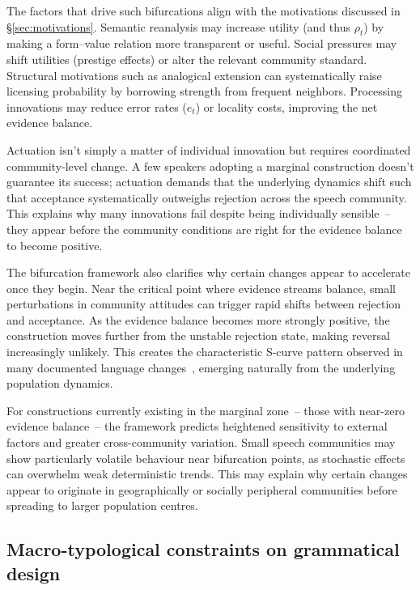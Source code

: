 \documentclass[12pt,letterpaper]{article}
\begin{document}
The factors that drive such bifurcations align with the motivations discussed in \S\ref{sec:motivations}. Semantic reanalysis may increase utility (and thus $\rho_t$) by making a form--value relation more transparent or useful. Social pressures may shift utilities (prestige effects) or alter the relevant community standard. Structural motivations such as analogical extension can systematically raise licensing probability by borrowing strength from frequent neighbors. Processing innovations may reduce error rates ($e_t$) or locality costs, improving the net evidence balance.

Actuation isn't simply a matter of individual innovation but requires coordinated community-level change. A few speakers adopting a marginal construction doesn't guarantee its success; actuation demands that the underlying dynamics shift such that acceptance systematically outweighs rejection across the speech community. This explains why many innovations fail despite being individually sensible~--  they appear before the community conditions are right for the evidence balance to become positive.

The bifurcation framework also clarifies why certain changes appear to accelerate once they begin. Near the critical point where evidence streams balance, small perturbations in community attitudes can trigger rapid shifts between rejection and acceptance. As the evidence balance becomes more strongly positive, the construction moves further from the unstable rejection state, making reversal increasingly unlikely. This creates the characteristic S-curve pattern observed in many documented language changes~\autocite{kroch1989}, emerging naturally from the underlying population dynamics.

For constructions currently existing in the marginal zone~--  those with near-zero evidence balance~--  the framework predicts heightened sensitivity to external factors and greater cross-community variation. Small speech communities may show particularly volatile behaviour near bifurcation points, as stochastic effects can overwhelm weak deterministic trends. This may explain why certain changes appear to originate in geographically or socially peripheral communities before spreading to larger population centres.

\subsection{Macro-typological constraints on grammatical design}
\end{document}
